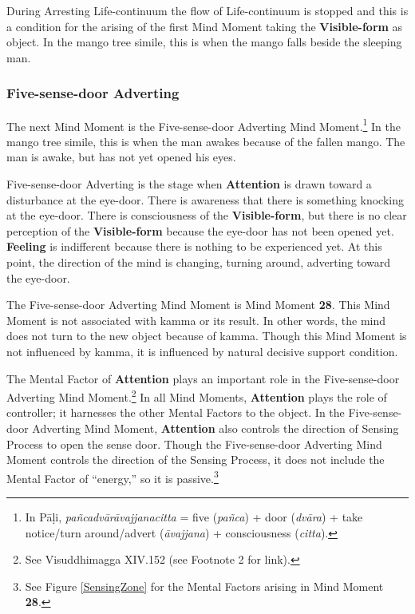 During Arresting Life-continuum the flow of Life-continuum is stopped and this is a condition for the arising of the first Mind Moment taking the \textbf{Visible-form} as object. In the mango tree simile, this is when the mango falls beside the sleeping man.

\subsubsection*{Five-sense-door Adverting}

The next Mind Moment is the Five-sense-door Adverting Mind Moment.\footnote{In Pāḷi, \textit{pañcadvārāvajjanacitta} = five (\textit{pañca}) + door (\textit{dvāra}) + take notice/turn around/advert (\textit{āvajjana}) + consciousness (\textit{citta}).} In the mango tree simile, this is when the man awakes because of the fallen mango. The man is awake, but has not yet opened his eyes. 

Five-sense-door Adverting is the stage when \textbf{Attention} is drawn toward a disturbance at the eye-door. There is awareness that there is something knocking at the eye-door. There is consciousness of the \textbf{Visible-form}, but there is no clear perception of the \textbf{Visible-form} because the eye-door has not been opened yet. \textbf{Feeling} is indifferent because there is nothing to be experienced yet. At this point, the direction of the mind is changing, turning around, adverting toward the eye-door.

The Five-sense-door Adverting Mind Moment is Mind Moment \textbf{28}. This Mind Moment is not associated with kamma or its result. In other words, the mind does not turn to the new object because of kamma. Though this Mind Moment is not influenced by kamma, it is influenced by natural decisive support condition.

The Mental Factor of \textbf{Attention} plays an important role in the Five-sense-door Adverting Mind Moment.\footnote{See Visuddhimagga XIV.152 (see Footnote 2 for link).} In all Mind Moments, \textbf{Attention} plays the role of controller; it harnesses the other Mental Factors to the object. In the Five-sense-door Adverting Mind Moment, \textbf{Attention} also controls the direction of Sensing Process to open the sense door. Though the Five-sense-door Adverting Mind Moment controls the direction of the Sensing Process, it does not include the Mental Factor of “energy,” so it is passive.\footnote{See Figure \ref{SensingZone} for the Mental Factors arising in Mind Moment \textbf{28}.}

